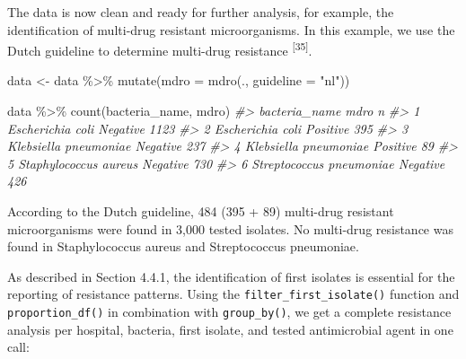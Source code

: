 \documentclass[
]{book}
\newenvironment{Shaded}{\begin{snugshade}}{\end{snugshade}}
\newcommand{\AttributeTok}[1]{\textcolor[rgb]{0.77,0.63,0.00}{#1}}
\newcommand{\CommentTok}[1]{\textcolor[rgb]{0.56,0.35,0.01}{\textit{#1}}}
\newcommand{\FunctionTok}[1]{\textcolor[rgb]{0.00,0.00,0.00}{#1}}
\newcommand{\NormalTok}[1]{#1}
\newcommand{\OtherTok}[1]{\textcolor[rgb]{0.56,0.35,0.01}{#1}}
\newcommand{\SpecialCharTok}[1]{\textcolor[rgb]{0.00,0.00,0.00}{#1}}
\newcommand{\StringTok}[1]{\textcolor[rgb]{0.31,0.60,0.02}{#1}}
\begin{document}
The data is now clean and ready for further analysis, for example, the identification of multi-drug resistant microorganisms. In this example, we use the Dutch guideline to determine multi-drug resistance \textsuperscript{{[}35{]}}.

\begin{Shaded}
\begin{Highlighting}[]
\NormalTok{data }\OtherTok{\textless{}{-}}\NormalTok{ data }\SpecialCharTok{\%\textgreater{}\%}
  \FunctionTok{mutate}\NormalTok{(}\AttributeTok{mdro =} \FunctionTok{mdro}\NormalTok{(., }\AttributeTok{guideline =} \StringTok{"nl"}\NormalTok{))}

\NormalTok{data }\SpecialCharTok{\%\textgreater{}\%}
  \FunctionTok{count}\NormalTok{(bacteria\_name, mdro)}
\CommentTok{\#\textgreater{}              bacteria\_name     mdro    n}
\CommentTok{\#\textgreater{} 1         Escherichia coli Negative 1123}
\CommentTok{\#\textgreater{} 2         Escherichia coli Positive  395}
\CommentTok{\#\textgreater{} 3    Klebsiella pneumoniae Negative  237}
\CommentTok{\#\textgreater{} 4    Klebsiella pneumoniae Positive   89}
\CommentTok{\#\textgreater{} 5    Staphylococcus aureus Negative  730}
\CommentTok{\#\textgreater{} 6 Streptococcus pneumoniae Negative  426}
\end{Highlighting}
\end{Shaded}

According to the Dutch guideline, 484 (395 + 89) multi-drug resistant microorganisms were found in 3,000 tested isolates. No multi-drug resistance was found in Staphylococcus aureus and Streptococcus pneumoniae.

As described in Section 4.4.1, the identification of first isolates is essential for the reporting of resistance patterns. Using the \texttt{filter\_first\_isolate()} function and \texttt{proportion\_df()} in combination with \texttt{group\_by()}, we get a complete resistance analysis per hospital, bacteria, first isolate, and tested antimicrobial agent in one call:
\end{document}
